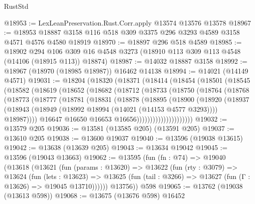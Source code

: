 \begin{lexlean}{RustStd}
\begin{coremodule}
@18953 := LexLeanPreservation.Rust.Corr.apply @13574 @13576 @13578
@18967 := @18953 @18887 @3158 @116 @518 @309 @3375 @296 @3293 @4589 @3158 @4571 @4576 @4580 @18919
@18970 := @18897 @296 @518 @4589
@18985 := @18902
    @294
    @106
    @309
    @16
    @4548
    @3273
    (@18910 @113 @309 @113 @4548 (@14106 (@18915 @113)) @18874)
@18987 := @14032 @18887 @3158
@18992 := @18967 (@18970 (@18985 @18987)) @16462 @14138
@18994 := @14021 (@14149 @4571)
@19031 := @18204
    (@18320
      (@18371
        (@18414
          (@18454
            (@18501
              (@18545
                (@18582
                  (@18619
                    (@18652
                      (@18682
                        (@18712
                          (@18733
                            (@18750
                              (@18764
                                (@18768
                                  (@18773
                                    (@18777
                                      (@18781
                                        (@18831
                                          (@18878
                                            (@18895
                                              (@18900
                                                (@18920
                                                  (@18937
                                                    (@18943
                                                      (@18949
                                                        (@18992
                                                          @18994
                                                          (@14021 (@14153 @4577 @3293))))
                                                      @18987))))
                                              @16647
                                              @16650
                                              @16653
                                              @16656)))))))))))))))))))))
@19032 := @13579 @205
@19036 := @13581 (@13585 @205) (@13591 @205)
@19037 := @13610 @205
@19038 := @13600 @19037
@19040 := @13596 (@19038 @13615)
@19042 := @13638 (@13639 @205)
@19043 := @13634 @19042
@19045 := @13596 (@19043 @13663)
@19062 := @13595
    (fun (fn : @74) =>
    @19040
      (@13618
        (@13621
          (fun (params : @13620) =>
          @13622
            (fun (rty : @3079) =>
            @13624
              (fun (lets : @13623) =>
              @13625 (fun (tail : @3266) => @13627 (fun (Γ : @13626) => @19045 @13710))))))
        @13756))
    @598
@19065 := @13762 (@19038 (@13613 @598))
@19068 := @13675 (@13676 @598) @16452

\end{coremodule}
\end{lexlean}
